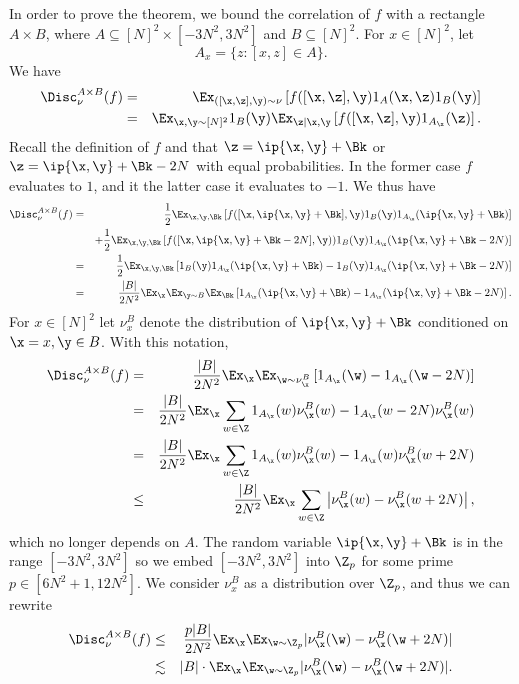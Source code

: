 In order to prove the theorem, we bound the correlation of $f$ with a rectangle $A \times B$, where  $A \subseteq [N]^2 \times  [- 3N^2, 3N^2]$ and $B \subseteq [N]^2$. For $x \in [N]^2$, let
$$A_x=\{z: [x,z] \in A\}.$$
We have
\begin{eqnarray*}
\Disc^{A \times B}_\nu(f) &=&   \Ex_{([\x,\z], \y) \sim \nu}  \left[ f([\x,\z],\y) 1_{A}(\x,\z)1_B(\y) \right] \\
	&=&  \Ex_{\x,\y \sim [N]^2} 1_B(\y)   \Ex_{\z|\x,\y}  \left[ f([\x,\z],\y) 1_{A_\x}(\z) \right].
 \end{eqnarray*}
 Recall the definition of $f$ and that $\z=\ip{\x,\y}+\Bk$ or $\z=\ip{\x,\y}+\Bk-2N$ with equal probabilities. In the former
 case $f$ evaluates to $1$, and it the latter case it evaluates to $-1$.
 We thus have
 \begin{eqnarray*}
\Disc^{A \times B}_\nu(f) &=&   \frac{1}{2} \Ex_{\x,\y,\Bk } \left[   f([\x,\ip{\x,\y}+\Bk],\y)  1_B(\y) 1_{A_\x}(\ip{\x,\y}+\Bk) \right] \\
 &&   +  \frac{1}{2} \Ex_{\x,\y,\Bk } \left[    f([\x,\ip{\x,\y}+\Bk-2N],\y) )  1_B(\y) 1_{A_\x}(\ip{\x,\y}+\Bk-2N)\right] \\
 &=&  \frac{1}{2} \Ex_{\x,\y,\Bk}  \left[ 1_B(\y)  1_{A_\x}(\ip{\x,\y}+\Bk)-  1_B(\y)  1_{A_\x}(\ip{\x,\y}+\Bk-2N) \right] \\
	 &=& \frac{|B|}{2N^2} \Ex_\x \Ex_{\y \sim B}\Ex_\Bk \left[ 1_{A_\x}(\ip{\x,\y}+\Bk)-     1_{A_\x}(\ip{\x,\y}+\Bk-2N) \right].
\end{eqnarray*}
For $x \in [N]^2$ let $\nu^B_x$ denote the distribution of $\ip{\x,\y}+\Bk$ conditioned on $\x = x, \y \in B$.  With this notation,
%
\begin{eqnarray*}
 \Disc^{A \times B}_\nu(f) &=& \frac{|B|}{2N^2} \Ex_\x \Ex_{\w \sim \nu^B_\x} \left[  1_{A_\x}(\w)- 1_{A_\x}(\w-2N) \right] \\
  &= & \frac{|B|}{2N^2} \Ex_\x  \sum_{w \in \Z} 1_{A_\x}(w) \nu_{\x}^B(w) - 1_{A_\x}(w-2N)   \nu_{\x}^B(w)  \\
  &=&  \frac{|B|}{2N^2} \Ex_\x  \sum_{w \in \Z} 1_{A_\x}(w) \nu_{\x}^B(w) - 1_{A_\x}(w)  \nu_{\x}^B(w+2N) \\
  & \le &  \frac{|B|}{2N^2}   \Ex_\x  \sum_{w \in \Z} \left|\nu_{\x}^B(w) -\nu_{\x}^B(w+2N)\right|,
  \end{eqnarray*}
	which no longer depends on $A$.  The random variable $\ip{\x,\y}+\Bk$ is in the range $[-3N^2,3N^2]$ so we embed $[-3N^2,3N^2]$ into $\Z_p$ for some prime $ p\in [6N^2+1,12N^2]$. We consider $\nu_x^B$ as a distribution over $\Z_p$, and thus we can rewrite
\begin{eqnarray*}
\label{eq:DiscSimplified}
	\Disc^{A \times B}_\nu(f) &\leq&  \frac{p |B| }{2N^2}   \Ex_\x  \Ex_{\w \sim \Z_p} |\nu_{\x}^B(\w) -\nu_{\x}^B(\w+2N)| \\
	&\lesssim& |B|\cdot \Ex_\x  \Ex_{\w \sim \Z_p} |\nu_{\x}^B(\w) -\nu_{\x}^B(\w+2N)|.
 \end{eqnarray*}


